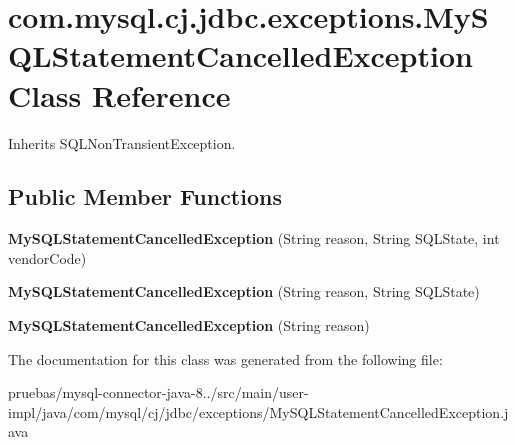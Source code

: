 \hypertarget{classcom_1_1mysql_1_1cj_1_1jdbc_1_1exceptions_1_1_my_s_q_l_statement_cancelled_exception}{}\section{com.\+mysql.\+cj.\+jdbc.\+exceptions.\+My\+S\+Q\+L\+Statement\+Cancelled\+Exception Class Reference}
\label{classcom_1_1mysql_1_1cj_1_1jdbc_1_1exceptions_1_1_my_s_q_l_statement_cancelled_exception}


Inherits S\+Q\+L\+Non\+Transient\+Exception.

\subsection*{Public Member Functions}
\begin{DoxyCompactItemize}
\item 
\mbox{\label{classcom_1_1mysql_1_1cj_1_1jdbc_1_1exceptions_1_1_my_s_q_l_statement_cancelled_exception_a7e54f5f18f5fefbb5d56d52ff368ef86}} 
{\bfseries My\+S\+Q\+L\+Statement\+Cancelled\+Exception} (String reason, String S\+Q\+L\+State, int vendor\+Code)
\item 
\mbox{\label{classcom_1_1mysql_1_1cj_1_1jdbc_1_1exceptions_1_1_my_s_q_l_statement_cancelled_exception_a1b415e43f94b919095c369802fb12b54}} 
{\bfseries My\+S\+Q\+L\+Statement\+Cancelled\+Exception} (String reason, String S\+Q\+L\+State)
\item 
\mbox{\label{classcom_1_1mysql_1_1cj_1_1jdbc_1_1exceptions_1_1_my_s_q_l_statement_cancelled_exception_a12ddd2c391ce0fe6a96e37ce7db2ca6b}} 
{\bfseries My\+S\+Q\+L\+Statement\+Cancelled\+Exception} (String reason)
\end{DoxyCompactItemize}


The documentation for this class was generated from the following file\+:\begin{DoxyCompactItemize}
\item 
pruebas/mysql-\/connector-\/java-\/8../src/main/user-\/impl/java/com/mysql/cj/jdbc/exceptions/My\+S\+Q\+L\+Statement\+Cancelled\+Exception.\+java\end{DoxyCompactItemize}

